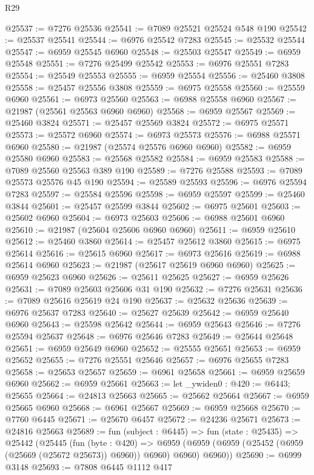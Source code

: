 \begin{lexlean}{R29}
\begin{coremodule}
@25537 := @7276 @25536
@25541 := @7089 @25521 @25524 @548 @190
@25542 := @25537 @25541
@25544 := @6976 @25542 @7283
@25545 := @25532 @25544
@25547 := @6959 @25545 @6960
@25548 := @25503 @25547
@25549 := @6959 @25548
@25551 := @7276 @25499 @25542
@25553 := @6976 @25551 @7283
@25554 := @25549 @25553
@25555 := @6959 @25554
@25556 := @25460 @3808
@25558 := @25457 @25556 @3808
@25559 := @6975 @25558
@25560 := @25559 @6960
@25561 := @6973 @25560
@25563 := @6988 @25558 @6960
@25567 := @21987 (@25561 @25563 @6960 @6960)
@25568 := @6959 @25567
@25569 := @25460 @3824
@25571 := @25457 @25569 @3824
@25572 := @6975 @25571
@25573 := @25572 @6960
@25574 := @6973 @25573
@25576 := @6988 @25571 @6960
@25580 := @21987 (@25574 @25576 @6960 @6960)
@25582 := @6959 @25580 @6960
@25583 := @25568 @25582
@25584 := @6959 @25583
@25588 := @7089 @25560 @25563 @389 @190
@25589 := @7276 @25588
@25593 := @7089 @25573 @25576 @45 @190
@25594 := @25589 @25593
@25596 := @6976 @25594 @7283
@25597 := @25584 @25596
@25598 := @6959 @25597
@25599 := @25460 @3844
@25601 := @25457 @25599 @3844
@25602 := @6975 @25601
@25603 := @25602 @6960
@25604 := @6973 @25603
@25606 := @6988 @25601 @6960
@25610 := @21987 (@25604 @25606 @6960 @6960)
@25611 := @6959 @25610
@25612 := @25460 @3860
@25614 := @25457 @25612 @3860
@25615 := @6975 @25614
@25616 := @25615 @6960
@25617 := @6973 @25616
@25619 := @6988 @25614 @6960
@25623 := @21987 (@25617 @25619 @6960 @6960)
@25625 := @6959 @25623 @6960
@25626 := @25611 @25625
@25627 := @6959 @25626
@25631 := @7089 @25603 @25606 @31 @190
@25632 := @7276 @25631
@25636 := @7089 @25616 @25619 @24 @190
@25637 := @25632 @25636
@25639 := @6976 @25637 @7283
@25640 := @25627 @25639
@25642 := @6959 @25640 @6960
@25643 := @25598 @25642
@25644 := @6959 @25643
@25646 := @7276 @25594 @25637
@25648 := @6976 @25646 @7283
@25649 := @25644 @25648
@25651 := @6959 @25649 @6960
@25652 := @25555 @25651
@25653 := @6959 @25652
@25655 := @7276 @25551 @25646
@25657 := @6976 @25655 @7283
@25658 := @25653 @25657
@25659 := @6961 @25658
@25661 := @6959 @25659 @6960
@25662 := @6959 @25661
@25663 := let _ywiden0 : @420 := @6443; @25655
@25664 := @24813 @25663
@25665 := @25662 @25664
@25667 := @6959 @25665 @6960
@25668 := @6961 @25667
@25669 := @6959 @25668
@25670 := @7760 @6445
@25671 := @25670 @6457
@25672 := @24236 @25671
@25673 := @24816 @25663
@25689 := fun (subject : @6445) =>
  fun (state : @25435) =>
  @25442
    (@25445
      (fun (byte : @420) =>
      @6959 (@6959 (@6959 (@25452 (@6959 (@25669 (@25672 @25673)) @6960)) @6960) @6960) @6960))
@25690 := @6999 @3148
@25693 := @7808 @6445 @1112 @417

\end{coremodule}
\end{lexlean}
